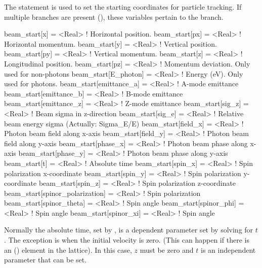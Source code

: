 The  statement is used to set the starting coordinates
for particle tracking. If multiple branches are present
(), these variables pertain to the 
branch.
\begin{example}
  beam_start[x]                   = <Real>   ! Horizontal position.
  beam_start[px]                  = <Real>   ! Horizontal momentum.
  beam_start[y]                   = <Real>   ! Vertical position.
  beam_start[py]                  = <Real>   ! Vertical momentum.
  beam_start[z]                   = <Real>   ! Longitudinal position.
  beam_start[pz]                  = <Real>   ! Momentum deviation. Only used for non-photons
  beam_start[E_photon]            = <Real>   ! Energy (eV). Only used for photons.
  beam_start[emittance_a]         = <Real>   ! A-mode emittance
  beam_start[emittance_b]         = <Real>   ! B-mode emittance
  beam_start[emittance_z]         = <Real>   ! Z-mode emittance
  beam_start[sig_z]               = <Real>   ! Beam sigma in z-direction
  beam_start[sig_e]               = <Real>   ! Relative beam energy sigma (Actually: Sigma_E/E)
  beam_start[field_x]             = <Real>   ! Photon beam field along x-axis
  beam_start[field_y]             = <Real>   ! Photon beam field along y-axis
  beam_start[phase_x]             = <Real>   ! Photon beam phase along x-axis
  beam_start[phase_y]             = <Real>   ! Photon beam phase along y-axis
  beam_start[t]                   = <Real>   ! Absolute time
  beam_start[spin_x]              = <Real>   ! Spin polarization x-coordinate
  beam_start[spin_y]              = <Real>   ! Spin polarization y-coordinate
  beam_start[spin_z]              = <Real>   ! Spin polarization z-coordinate
  beam_start[spinor_polarization] = <Real>   ! Spin polarization
  beam_start[spinor_theta]        = <Real>   ! Spin angle
  beam_start[spinor_phi]          = <Real>   ! Spin angle
  beam_start[spinor_xi]           = <Real>   ! Spin angle
\end{example}
Normally the absolute time, set by , is a dependent
parameter set by solving  for $t$. The exception is when the
initial velocity is zero. (This can happen if there is an 
() element in the lattice). In this case, $z$ must be
zero and $t$ is an independent parameter that can be set.

